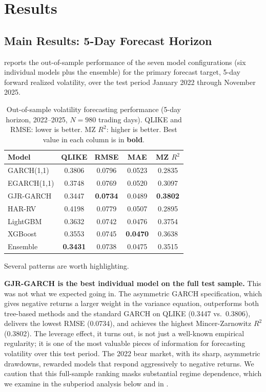 \section{Results}\label{sec:results}

\subsection{Main Results: 5-Day Forecast Horizon}

 reports the out-of-sample performance of the seven model configurations (six individual models plus the ensemble) for the primary forecast target, 5-day forward realized volatility, over the test period January 2022 through November 2025.

\begin{table}[H]
\centering
\caption{Out-of-sample volatility forecasting performance (5-day horizon, 2022--2025, $N = 980$ trading days). QLIKE and RMSE: lower is better. MZ $R^2$: higher is better. Best value in each column is in \textbf{bold}.}
\label{tab:main_results}
\begin{tabular}{l c c c c}
\toprule
\textbf{Model} & \textbf{QLIKE} & \textbf{RMSE} & \textbf{MAE} & \textbf{MZ $R^2$} \\
\midrule
GARCH(1,1)   & 0.3806 & 0.0796 & 0.0523 & 0.2835 \\
EGARCH(1,1)  & 0.3748 & 0.0769 & 0.0520 & 0.3097 \\
GJR-GARCH    & 0.3447 & \textbf{0.0734} & 0.0489 & \textbf{0.3802} \\
\midrule
HAR-RV       & 0.4198 & 0.0779 & 0.0507 & 0.2895 \\
\midrule
LightGBM     & 0.3632 & 0.0742 & 0.0476 & 0.3754 \\
XGBoost      & 0.3553 & 0.0745 & \textbf{0.0470} & 0.3638 \\
\midrule
Ensemble     & \textbf{0.3431} & 0.0738 & 0.0475 & 0.3515 \\
\bottomrule
\end{tabular}
\end{table}

Several patterns are worth highlighting.

\textbf{GJR-GARCH is the best individual model on the full test sample.} This was not what we expected going in. The asymmetric GARCH specification, which gives negative returns a larger weight in the variance equation, outperforms both tree-based methods and the standard GARCH on QLIKE (0.3447 vs.\ 0.3806), delivers the lowest RMSE (0.0734), and achieves the highest Mincer-Zarnowitz $R^2$ (0.3802). The leverage effect, it turns out, is not just a well-known empirical regularity; it is one of the most valuable pieces of information for forecasting volatility over this test period. The 2022 bear market, with its sharp, asymmetric drawdowns, rewarded models that respond aggressively to negative returns. We caution that this full-sample ranking masks substantial regime dependence, which we examine in the subperiod analysis below and in .

